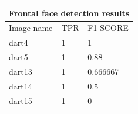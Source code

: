 \documentclass{article}
\begin{document}
\begin{tabular}{ |p{3cm}||p{3cm}|p{3cm}| }
 \hline
 \multicolumn{3}{|c|}{Frontal face detection results} \\
 \hline
 Image name & TPR & F1-SCORE \\
 \hline
 dart4  & 1   & 1         \\
 dart5  & 1   & 0.88      \\
 dart13 & 1   & 0.666667  \\ 
 dart14 & 1   & 0.5       \\ 
 dart15 & 1   & 0         \\ 
 \hline
\end{tabular}
\end{document}
